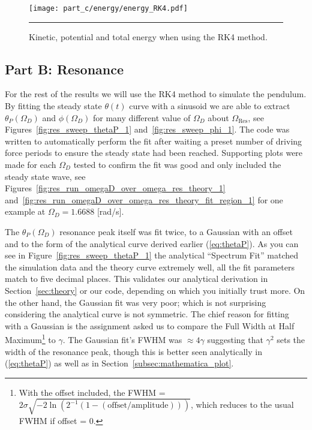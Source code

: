 \documentclass[notitlepage,aps,prd,nofootinbib]{revtex4-1}
\begin{document}
\begin{figure}[!htbc]
  \centering
  \texttt{[image: part\_c/energy/energy\_RK4.pdf]}
	{\par\nobreak\rule[9pt]{35em}{0.5pt}\vspace{-5mm}}
	\caption{Kinetic, potential and total energy when using the RK4 method.}
	\label{fig:energy_RK4}
\end{figure}

\clearpage
\subsection{Part B: Resonance}
\label{subsec:resonance_results}
For the rest of the results we will use the RK4 method to simulate the pendulum. By fitting the steady state $\theta\left(t\right)$ curve with a sinusoid we are able to extract $\theta_{P}\left(\Omega_{D}\right)$ and $\phi\left(\Omega_{D}\right)$ for many different value of $\Omega_{D}$ about $\Omega_{\text{Res}}$, see Figures~\ref{fig:res_sweep_thetaP_1} and~\ref{fig:res_sweep_phi_1}. The code was written to automatically perform the fit after waiting a preset number of driving force periods to ensure the steady state had been reached. Supporting plots were made for each $\Omega_{D}$ tested to confirm the fit was good and only included the steady state wave, see Figures~\ref{fig:res_run_omegaD_over_omega_res_theory_1} and~\ref{fig:res_run_omegaD_over_omega_res_theory_fit_region_1} for one example at $\Omega_{D} = 1.6688$ [rad/s].

The $\theta_{P}\left(\Omega_{D}\right)$ resonance peak itself was fit twice, to a Gaussian with an offset and to the form of the analytical curve derived earlier (\ref{eq:thetaP}). As you can see in Figure~\ref{fig:res_sweep_thetaP_1} the analytical ``Spectrum Fit'' matched the simulation data and the theory curve extremely well, all the fit parameters match to five decimal places. This validates our analytical derivation in Section~\ref{sec:theory} or our code, depending on which you initially trust more. On the other hand, the Gaussian fit was very poor; which is not surprising considering the analytical curve is not symmetric. The chief reason for fitting with a Gaussian is the assignment asked us to compare the Full Width at Half Maximum\footnote{With the offset included, the FWHM = $2\sigma\sqrt{-2\ln{\left(2^{-1} (1-(\text{offset}/\text{amplitude}))\right)}}$, which reduces to the usual FWHM if offset = 0.} to $\gamma$. The Gaussian fit's FWHM was $\approx 4\gamma$ suggesting that $\gamma^2$ sets the width of the resonance peak, though this is better seen analytically in (\ref{eq:thetaP}) as well as in Section~\ref{subsec:mathematica_plot}.
\end{document}
